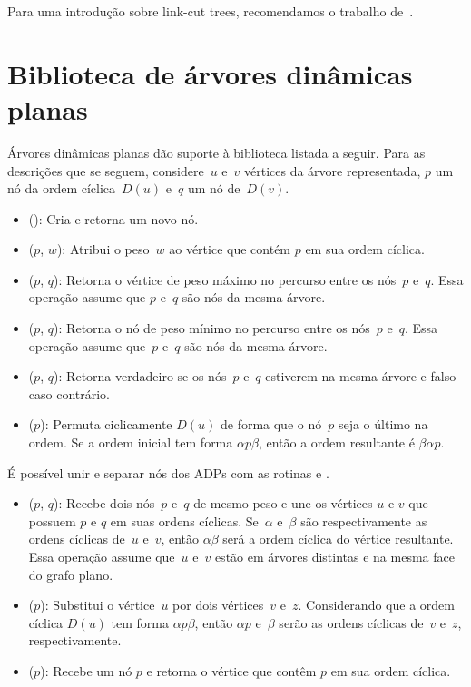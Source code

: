 Para uma introdução sobre link-cut trees, recomendamos o trabalho de~\cite{linkcuttree}.

\section{Biblioteca de árvores dinâmicas planas}
\label{sec:EODT}

Árvores dinâmicas planas dão suporte à biblioteca listada a seguir.
Para as descrições que se seguem, considere~$u$ e~$v$ vértices da árvore representada,
$p$ um nó da ordem cíclica~$D(u)$ e~$q$ um nó de~$D(v)$.

\begin{itemize}
\item \LCOMakeNode(): Cria e retorna um novo nó.
\item \LCOAddCost($p$, $w$): Atribui o peso~$w$ ao vértice que contém $p$ em sua ordem cíclica.
\item \LCOMax($p$, $q$): Retorna o vértice de peso máximo no percurso entre os nós~$p$ e~$q$.
Essa operação assume que $p$ e~$q$ são nós da mesma árvore.
\item \LCOMin($p$, $q$): Retorna o nó de peso mínimo no percurso entre os nós~$p$ e~$q$.
Essa operação assume que~$p$ e~$q$ são nós da mesma árvore.
\item \LCOConnected($p$, $q$): Retorna verdadeiro se os nós~$p$ e~$q$ estiverem na mesma árvore e falso caso contrário.
\item \LCOCycle($p$): Permuta ciclicamente $D(u)$ de forma que o nó~$p$ seja o último na ordem.
Se a ordem inicial tem forma $\alpha p \beta$, então a ordem resultante é $\beta\alpha p$.
\end{itemize}

É possível unir e separar nós dos ADPs com as rotinas \LCOMerge{} e \LCOSplit{}.

\begin{itemize}
\item \LCOMerge($p$, $q$): Recebe dois nós~$p$ e~$q$ de mesmo peso e une os vértices $u$ e $v$ que possuem $p$ e $q$ em suas ordens cíclicas.
Se~$\alpha$ e~$\beta$ são respectivamente as ordens cíclicas de~$u$ e~$v$, então $\alpha\beta$ será a ordem cíclica do vértice resultante. 
Essa operação assume que~$u$ e~$v$ estão em árvores distintas e na mesma face do grafo plano.
\item \LCOSplit($p$): Substitui o vértice~$u$ por dois vértices~$v$ e~$z$.
Considerando que a ordem cíclica $D(u)$ tem forma $\alpha p\beta$, então $\alpha p$ e~$\beta$ serão as ordens cíclicas de~$v$ e~$z$, respectivamente.
\item \LCOFindNode($p$): Recebe um nó $p$ e retorna o vértice que contêm $p$ em sua ordem cíclica.
\end{itemize}


